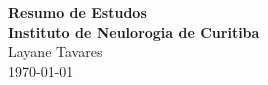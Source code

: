 \documentclass[idxtotoc,hyperref,openany]{article} %
\begin{document}

\begin{center}
\Huge \textbf{Resumo de Estudos} \\[0.2cm] 
\Large \textbf{Instituto de Neulorogia de Curitiba}\\ 
\Huge Layane Tavares \\[.2cm] %
\today
\end{center}


\end{document}
